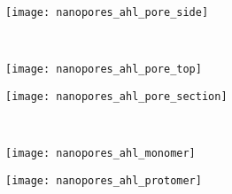 %
\begin{figure*}[p]
  \centering
  \medskip
  
  \begin{minipage}[t]{53mm}
    \begin{subfigure}[b]{53mm}
      \centering
      \caption{}\vspace{-8.5mm}\hspace{1.5mm}\label{fig:nanopores_ahl_pore_side}
      \texttt{[image: nanopores\_ahl\_pore\_side]}
    \end{subfigure}
    \vspace{5mm} \\
    \begin{subfigure}[b]{53mm}
      \centering
      \caption{}\vspace{-8.5mm}\hspace{1.5mm}\label{fignanopores_ahl_pore_top}
      \texttt{[image: nanopores\_ahl\_pore\_top]}
    \end{subfigure}
  \end{minipage}
  \begin{minipage}{65mm}
    \begin{subfigure}[t]{53mm}
      \centering
      \caption{}\vspace{-8.5mm}\hspace{1.5mm}\label{fig:nanopores_ahl_pore_section}
      \texttt{[image: nanopores\_ahl\_pore\_section]}
    \end{subfigure}
    \vspace{5mm} \\
    \begin{subfigure}[b]{32mm}
      \caption{}\vspace{-8.5mm}\hspace{1.5mm}\label{fig:nanopores_ahl_monomer}
      \texttt{[image: nanopores\_ahl\_monomer]}
    \end{subfigure}
    \begin{subfigure}[b]{32mm}
      \centering
      \caption{}\vspace{-8.5mm}\hspace{1.5mm}\label{fig:nanopores_ahl_protomer}
      \texttt{[image: nanopores\_ahl\_protomer]}
    \end{subfigure}
  \end{minipage}
%


\end{figure*}
